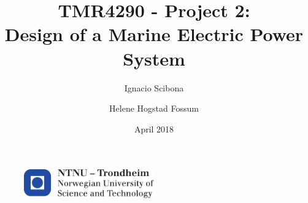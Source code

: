\documentclass{article}
\author{Ignacio Scibona \and Helene Hogstad Fossum}
\date{April 2018}
\title{TMR4290 - Project 2: \\ Design of a Marine Electric Power System}
\begin{document}
\begin{titlepage} 
    \maketitle
    \thispagestyle{empty}
    \begin{figure}
    \centering
    \includegraphics[width=0.5\textwidth]{utils/logontnu_eng.pdf}
    \end{figure}
    
\end{titlepage}

\newpage
{}

\tableofcontents

\setcounter{page}{1}
\newpage








%

\newpage
\thispagestyle{empty}




\newpage
{}
\setcounter{page}{1}

\end{document}
